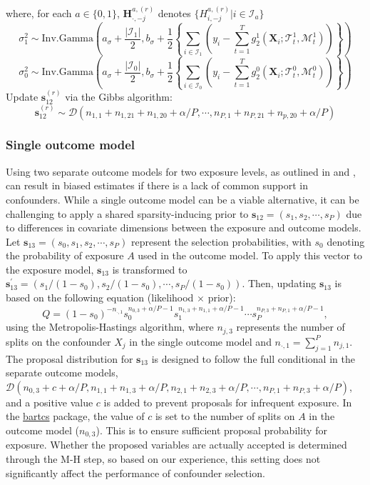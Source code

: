 \begin{algorithm}
\begin{algorithmic}[1]
where, for each $a\in\{0,1\}$, $\boldsymbol{H}_{\cdot, -j}^{a, (r)}$ denotes $\{H_{i, -j}^{a, (r)} | i \in \mathcal{I}_a\}$
\EndFor
\State \[\sigma^2_{1} \sim \text{Inv.Gamma}\left(a_\sigma+\frac{|\mathcal{I}_1|}{2}, b_\sigma+\frac{1}{2}\left\{\sum_{i \in \mathcal{I}_1} \left(y_i - \sum_{t=1}^T g_2^1(\boldsymbol{X}_i; \mathcal{T}_t^1, \mathcal{M}_t^1)\right) \right\}\right)\]
\[\sigma^2_{0} \sim \text{Inv.Gamma}\left(a_\sigma+\frac{|\mathcal{I}_0|}{2}, b_\sigma+\frac{1}{2}\left\{\sum_{i \in \mathcal{I}_0} \left(y_i - \sum_{t=1}^T g_2^0(\boldsymbol{X}_i; \mathcal{T}_t^0, \mathcal{M}_t^0)\right) \right\}\right)\]
\State Update $\boldsymbol{s}_{12}^{(r)}$ via the Gibbs algorithm:
 \[\boldsymbol{s}_{12}^{(r)} \sim \mathcal{D}\left(n_{1,1}+n_{1,21}+n_{1,20} + \alpha/P, \cdots, n_{P,1}+n_{P,21}+n_{p,20} + \alpha/P\right)\]
\EndFor
\end{algorithmic}
\end{algorithm}

\subsubsection{Single outcome model}
Using two separate outcome models for two exposure levels, as outlined in \cite{bartcause} and \cite{hahn2020bayesian}, can result in biased estimates if there is a lack of common support in confounders. While a single outcome model can be a viable alternative, it can be challenging to apply a shared sparsity-inducing prior to $\boldsymbol{s}_{12} = (s_1, s_2, \cdots, s_P)$ due to differences in covariate dimensions between the exposure and outcome models. Let $\boldsymbol{s}_{13} =(s_0, s_1, s_2, \cdots, s_P)$ represent the selection probabilities, with $s_0$ denoting the probability of exposure $A$ used in the outcome model. To apply this vector to the exposure model, $\boldsymbol{s}_{13}$ is transformed to $\boldsymbol{s}_{13}^\prime = (s_1/(1-s_0), s_2/(1-s_0), \cdots, s_P/(1-s_0))$. Then, updating $\boldsymbol{s}_{13}$ is based on the following equation (likelihood $\times$ prior):
 \[Q = \left(1-s_0\right)^{-n_{\cdot,1}} s_0^{n_{0,3}+\alpha/P-1} s_1^{n_{1,3}+n_{1,1}+\alpha/P-1} \cdots s_P^{n_{P,3}+n_{P,1}+\alpha/P-1},\] using the Metropolis-Hastings algorithm, where $n_{j,3}$ represents the number of splits on the confounder $X_j$ in the single outcome model and $n_{\cdot, 1} = \sum_{j=1}^P n_{j,1}$. The proposal distribution for $\boldsymbol{s}_{13}$ is designed to follow the full conditional in the separate outcome models, $\mathcal{D}(n_{0,3}+c+\alpha/P, n_{1,1}+n_{1,3}+\alpha/P, n_{2,1}+n_{2,3}+\alpha/P, \cdots, n_{P,1}+n_{P,3}+\alpha/P)$, and a positive value $c$ is added to prevent proposals for infrequent exposure. In the \href{https://cran.r-project.org/package=bartcs}{bartcs} package, the value of $c$ is set to the number of splits on $A$ in the outcome model ($n_{0,3}$). This is to ensure sufficient proposal probability for exposure. Whether the proposed variables are actually accepted is determined through the M-H step, so based on our experience, this setting does not significantly affect the performance of confounder selection.

